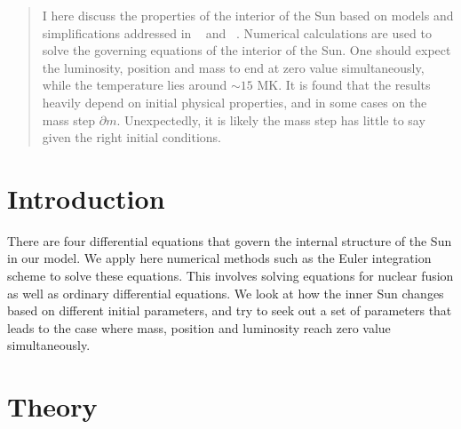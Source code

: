 \documentclass[a4paper, 11pt, english]{article}
\author{Vedad Hodzic}
\begin{document}
\begin{titlepage}
    \thispagestyle{empty}
    
\end{titlepage}

\begin{abstract}
	I here discuss the properties of the interior of the Sun based on models and
	simplifications addressed in ~\cite{stix} and ~\cite{gudiksen}. Numerical calculations
	are used to solve the governing equations of the interior of the Sun.
	One should expect the luminosity, position and mass to end at zero
	value simultaneously, while the temperature lies around $\sim15$ MK. It is found
	that the results heavily depend on initial physical properties, and in some cases on the
	mass step $\partial m$. Unexpectedly, it is likely the mass step has little to say
	given the right initial conditions.
\end{abstract}

\section{Introduction}

There are four differential equations that govern the internal structure of the Sun in our
model. We apply here numerical methods such as the Euler integration scheme to solve these
equations. This involves solving equations for nuclear fusion as well as ordinary
differential equations. We look at how the inner Sun changes based on different initial
parameters, and try to seek out a set of parameters that leads to the case where mass,
position and luminosity reach zero value simultaneously. 

\section{Theory}
\end{document}
